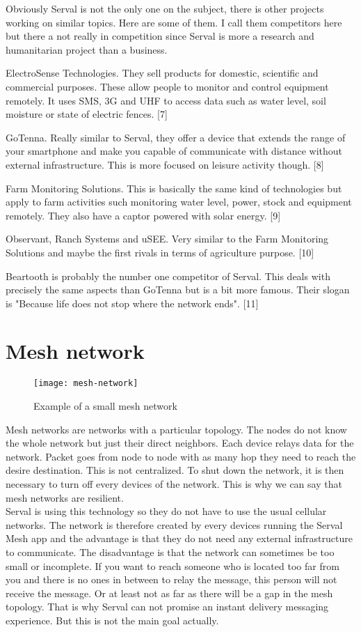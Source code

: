 Obviously Serval is not the only one on the subject, there is other projects working on similar topics. Here are some of them. I call them competitors here but there a not really in competition since Serval is more a research and humanitarian project than a business. 
\par
ElectroSense Technologies. They sell products for domestic, scientific and commercial purposes. These allow people to monitor and control equipment remotely. It uses SMS, 3G and UHF to access data such as water level, soil moisture or state of electric fences. [7]
\par
GoTenna. Really similar to Serval, they offer a device that extends the range of your smartphone and make you capable of communicate with distance without external infrastructure. This is more focused on leisure activity though. [8]
\par
Farm Monitoring Solutions. This is basically the same kind of technologies but apply to farm activities such monitoring water level, power, stock and equipment remotely. They also have a captor powered with solar energy. [9]
\par 
Observant, Ranch Systems and uSEE. Very similar to the Farm Monitoring Solutions and maybe the first rivals in terms of agriculture purpose. [10]
\par
Beartooth is probably the number one competitor of Serval. This deals with precisely the same aspects than GoTenna but is a bit more famous. Their slogan is "Because life does not stop where the network ends". [11]

\section{Mesh network}
\begin{figure}[h]
\centering
\texttt{[image: mesh-network]}
\caption{Example of a small mesh network}
\end{figure}

Mesh networks are networks with a particular topology. The nodes do not know the whole network but just their direct neighbors. Each device relays data for the network. Packet goes from node to node with as many hop they need to reach the desire destination. This is not centralized. To shut down the network, it is then necessary to turn off every devices of the network. This is why we can say that mesh networks are resilient. \\
Serval is using this technology so they do not have to use the usual cellular networks. The network is therefore created by every devices running the Serval Mesh app and the advantage is that they do not need any external infrastructure to communicate. The disadvantage is that the network can sometimes be too small or incomplete. If you want to reach someone who is located too far from you and there is no ones in between to relay the message, this person will not receive the message. Or at least not as far as there will be a gap in the mesh topology. That is why Serval can not promise an instant delivery messaging experience. But this is not the main goal actually.

